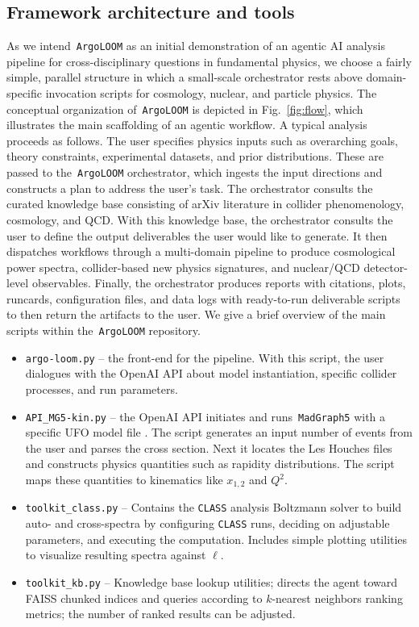 \documentclass[final,3p,times,sort,compress]{elsarticle}
\newcommand{\AL}{\texttt{ArgoLOOM}\xspace}
\newcommand{\CLASS}{\texttt{CLASS}\xspace}
\newcommand{\MG}{\texttt{MadGraph5}\xspace}
\begin{document}
\subsection{Framework architecture and tools}
\label{sec:arch}
%
As we intend~\AL as an initial demonstration of an agentic AI analysis pipeline for cross-disciplinary
questions in fundamental physics, we choose a fairly simple, parallel structure in which a
small-scale orchestrator rests above domain-specific invocation scripts for
cosmology, nuclear, and particle physics.
%
The conceptual organization of~\AL is depicted in Fig.~\ref{fig:flow}, which illustrates the main scaffolding of an agentic workflow.
%
A typical analysis proceeds as follows. 
%
The user specifies physics inputs such as overarching goals, theory constraints, experimental datasets, and prior distributions. 
%
These are passed to the~\AL orchestrator, which ingests the input directions and constructs a plan to address the user's task. 
%
The orchestrator consults the curated knowledge base consisting of arXiv literature in collider phenomenology, cosmology, and QCD. With this knowledge base, the orchestrator consults the user to define the output deliverables the user would like to generate.
%
It then dispatches workflows through a multi-domain pipeline to produce cosmological power spectra, collider-based new physics signatures, and nuclear/QCD detector-level observables.
%
Finally, the orchestrator produces reports with citations, plots, runcards, configuration files, and data logs with ready-to-run deliverable scripts to then return the artifacts to the user.
%
We give a brief overview of the main scripts within the~\AL repository.
%
\begin{itemize}
  \item \texttt{argo-loom.py} -- the front-end for the pipeline. With this script, the user dialogues with the OpenAI API about model instantiation, specific collider processes, and run parameters.
  \item \texttt{API\_MG5-kin.py} -- the OpenAI API initiates and runs~\MG with a specific UFO model file \cite{Degrande:2011ua}. The script generates an input number of events from the user and parses the cross section. Next it locates the Les Houches files and constructs physics quantities such as rapidity distributions. The script maps these quantities to kinematics like $x_{1,2}$ and $Q^{2}$. 
  \item \texttt{toolkit\_class.py} -- Contains the \CLASS analysis Boltzmann solver to build auto- and cross-spectra by configuring \CLASS runs, deciding on adjustable parameters, and executing the computation. Includes simple plotting utilities to visualize resulting spectra against $\ell$.
  \item \texttt{toolkit\_kb.py} -- Knowledge base lookup utilities; directs the agent toward FAISS chunked indices and queries according to $k$-nearest neighbors ranking metrics; the number of ranked results can be adjusted.
\end{itemize}
\end{document}
